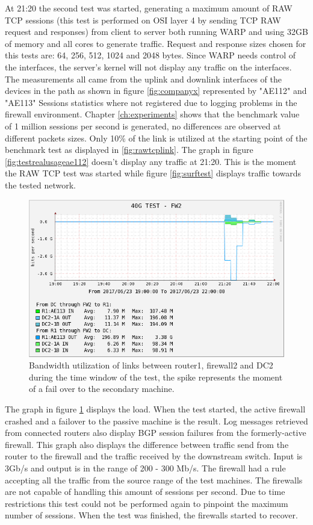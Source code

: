 At 21:20 the second test was started, generating a maximum amount of RAW TCP sessions (this test is performed on OSI layer 4 by sending TCP RAW request and responses) from client to server both running WARP and using 32GB of memory and all cores to generate traffic.
Request and response sizes chosen for this tests are: 64, 256, 512, 1024 and 2048 bytes. 
Since WARP needs control of the interfaces, the server's kernel will not display any traffic on the interfaces. 
The measurements all came from the uplink and downlink interfaces of the devices in the path as shown in figure \ref{fig:companyx} represented by "AE112" and "AE113"
Sessions statistics where not registered due to logging problems in the firewall environment. 
Chapter \ref{ch:experiments} shows that the benchmark value of 1 million sessions per second is generated, no differences are observed at different packets sizes. 
Only 10\% of the link is utilized at the starting point of the benchmark test as displayed in \ref{fig:rawtcplink}. 
The graph in figure \ref{fig:testrealusageae112} doesn't display any traffic at 21:20. This is the moment the RAW TCP test was started while figure \ref{fig:surftest} displays traffic towards the tested network. 

\begin{figure}[H]
  \includegraphics[scale=0.5]{images/real-ae113.png}
  \caption{Bandwidth utilization of links between router1, firewall2 and DC2 during the time window of the test, the spike represents the moment of a fail over to the secondary machine.}
  \label{fig:testrealusageae113}
\end{figure}

The graph in figure \ref{fig:testrealusageae113} displays the load. When the test started, the active firewall crashed and a failover to the passive machine is the result. Log messages retrieved from connected routers also display BGP session failures from the formerly-active firewall. 
This graph also displays the difference between traffic send from the router to the firewall and the traffic received by the downstream switch. 
Input is 3Gb/s and output is in the range of 200 - 300 Mb/s. The firewall had a rule accepting all the traffic from the source range of the test machines.
The firewalls are not capable of handling this amount of sessions per second. Due to time restrictions this test could not be performed again to pinpoint the maximum number of sessions.  
When the test was finished, the firewalls started to recover. \\ 

